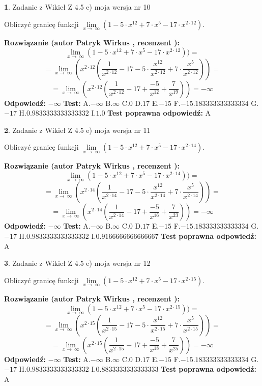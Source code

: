 \documentclass[12pt, a4paper]{article}
\theoremstyle{definition} %
\newtheorem{zad}{}
\newcommand{\zadStart}[1]{\begin{zad}#1\newline}
\newcommand{\zadStop}{\end{zad}}
\newcommand{\rozwStart}[2]{\noindent \textbf{Rozwiązanie (autor #1 , recenzent #2): }\newline}
\newcommand{\rozwStop}{\newline}
\newcommand{\odpStart}{\noindent \textbf{Odpowiedź:}\newline}
\newcommand{\odpStop}{\newline}
\newcommand{\testStart}{\noindent \textbf{Test:}\newline}
\newcommand{\testStop}{\newline}
\newcommand{\kluczStart}{\noindent \textbf{Test poprawna odpowiedź:}\newline}
\newcommand{\kluczStop}{\newline}
\begin{document}
\zadStart{Zadanie z Wikieł Z 4.5 e) moja wersja nr 10}


Obliczyć granicę funkcji  $\lim\limits_{x\to\ \infty}(1 - 5 \cdot x^{12}+7 \cdot x^{5}- 17 \cdot x^{2\cdot12})$.
\zadStop
\rozwStart{Patryk Wirkus}{}
$$\lim\limits_{x\to\ \infty}(1 - 5 \cdot x^{12}+7 \cdot x^{5}- 17 \cdot x^{2\cdot12}))=$$
$$=\lim\limits_{x\to\ \infty}(x^{2\cdot12}(\frac{1}{x^{2\cdot12}}-17 -5 \cdot \frac{x^{12}}{x^{2\cdot12}}+7 \cdot \frac{x^{5}}{x^{2\cdot12}}))=$$
$$=\lim\limits_{x\to\ \infty}(x^{2\cdot12}(\frac{1}{x^{2\cdot12}}-17 + \frac{-5}{x^{12}}+ \frac{7}{x^{19}}))=-\infty$$
\rozwStop
\odpStart
$-\infty$
\odpStop
\testStart
A.$-\infty$ B.$\infty$ C.$0$ D.$17$ E.$-15$
F.$-15.183333333333334$ G.$-17$
H.$0.9833333333333332$
I.$1.0$
\testStop
\kluczStart
A
\kluczStop



\zadStart{Zadanie z Wikieł Z 4.5 e) moja wersja nr 11}


Obliczyć granicę funkcji  $\lim\limits_{x\to\ \infty}(1 - 5 \cdot x^{12}+7 \cdot x^{5}- 17 \cdot x^{2\cdot14})$.
\zadStop
\rozwStart{Patryk Wirkus}{}
$$\lim\limits_{x\to\ \infty}(1 - 5 \cdot x^{12}+7 \cdot x^{5}- 17 \cdot x^{2\cdot14}))=$$
$$=\lim\limits_{x\to\ \infty}(x^{2\cdot14}(\frac{1}{x^{2\cdot14}}-17 -5 \cdot \frac{x^{12}}{x^{2\cdot14}}+7 \cdot \frac{x^{5}}{x^{2\cdot14}}))=$$
$$=\lim\limits_{x\to\ \infty}(x^{2\cdot14}(\frac{1}{x^{2\cdot14}}-17 + \frac{-5}{x^{16}}+ \frac{7}{x^{23}}))=-\infty$$
\rozwStop
\odpStart
$-\infty$
\odpStop
\testStart
A.$-\infty$ B.$\infty$ C.$0$ D.$17$ E.$-15$
F.$-15.183333333333334$ G.$-17$
H.$0.9833333333333332$
I.$0.9166666666666667$
\testStop
\kluczStart
A
\kluczStop



\zadStart{Zadanie z Wikieł Z 4.5 e) moja wersja nr 12}


Obliczyć granicę funkcji  $\lim\limits_{x\to\ \infty}(1 - 5 \cdot x^{12}+7 \cdot x^{5}- 17 \cdot x^{2\cdot15})$.
\zadStop
\rozwStart{Patryk Wirkus}{}
$$\lim\limits_{x\to\ \infty}(1 - 5 \cdot x^{12}+7 \cdot x^{5}- 17 \cdot x^{2\cdot15}))=$$
$$=\lim\limits_{x\to\ \infty}(x^{2\cdot15}(\frac{1}{x^{2\cdot15}}-17 -5 \cdot \frac{x^{12}}{x^{2\cdot15}}+7 \cdot \frac{x^{5}}{x^{2\cdot15}}))=$$
$$=\lim\limits_{x\to\ \infty}(x^{2\cdot15}(\frac{1}{x^{2\cdot15}}-17 + \frac{-5}{x^{18}}+ \frac{7}{x^{25}}))=-\infty$$
\rozwStop
\odpStart
$-\infty$
\odpStop
\testStart
A.$-\infty$ B.$\infty$ C.$0$ D.$17$ E.$-15$
F.$-15.183333333333334$ G.$-17$
H.$0.9833333333333332$
I.$0.8833333333333333$
\testStop
\kluczStart
A
\kluczStop
\end{document}
